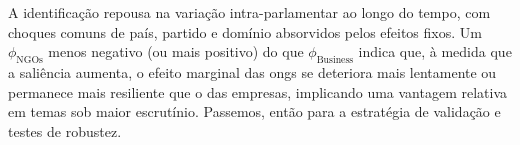 A identificação repousa na variação intra-parlamentar ao longo do tempo, com choques comuns de país, partido e domínio absorvidos pelos efeitos fixos. Um \(\phi_{\text{NGOs}}\) menos negativo (ou mais positivo) do que \(\phi_{\text{Business}}\) indica que, à medida que a saliência aumenta, o efeito marginal das \acrshort{ong}s se deteriora mais lentamente ou permanece mais resiliente que o das empresas, implicando uma vantagem relativa em temas sob maior escrutínio. Passemos, então para a estratégia de validação e testes de robustez.
